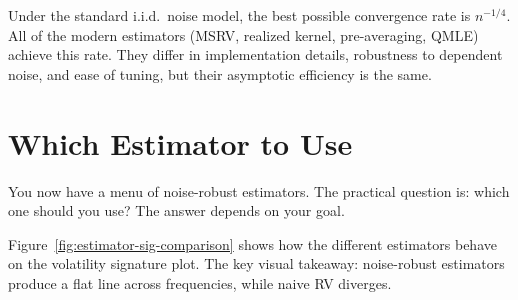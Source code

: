 \begin{keyidea}
Under the standard i.i.d.\ noise model, the best possible convergence rate is $n^{-1/4}$.
All of the modern estimators (MSRV, realized kernel, pre-averaging, QMLE) achieve this rate.
They differ in implementation details, robustness to dependent noise, and ease of tuning, but their asymptotic efficiency is the same.
\end{keyidea}


\section{Which Estimator to Use}
\label{sec:which-estimator}

You now have a menu of noise-robust estimators.
The practical question is: which one should you use?
The answer depends on your goal.

Figure~\ref{fig:estimator-sig-comparison} shows how the different estimators behave on the volatility signature plot.
The key visual takeaway: noise-robust estimators produce a flat line across frequencies, while naive RV diverges.


